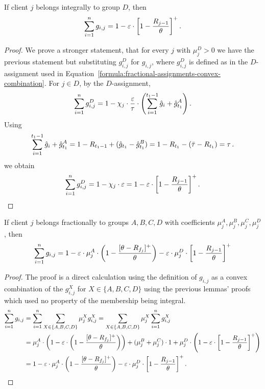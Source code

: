 \begin{lemma}\label{lem:gen-D}
    If client $j$ belongs integrally to group $D$, then
    \begin{equation*}
       \sum_{i=1}^n g_{i,j} = 1 - \varepsilon \cdot \left[1 - \frac{R_{j-1}}{\theta}\right]^+.
    \end{equation*}
\end{lemma}
\begin{proof}
    We prove a stronger statement, that for every $j$ with $\mu_j^D > 0$ we have the previous statement but substituting $g_{i,j}^D$ for $g_{i,j}$, where $g_{i,j}^D$ is defined as in the $D$-assignment used in Equation~\ref{formula:fractional-assignments-convex-combination}.
    For $j \in D$, by the $D$-assignment,
    \begin{equation*}
        \sum_{i=1}^n g_{i,j}^D = 1 - \chi_j \cdot \frac{\varepsilon}{\tau} \cdot \left(\sum_{i=1}^{t_1-1} \hat{g}_i + \hat{g}_{t_1}^A\right).
    \end{equation*}
    Using
    \begin{equation*}
        \sum_{i=1}^{t_1-1} \hat{g}_i + \hat{g}_{t_1}^A = 1 - R_{t_1 - 1} + (\hat{g}_{t_1} - \hat{g}_{t_1}^B) = 1 - R_{t_1} - (\bar\tau - R_{t_1}) = \tau\,.
    \end{equation*}
    we obtain
    \begin{equation*}
        \sum_{i=1}^n g_{i,j}^D = 1 - \chi_j \cdot \varepsilon
        = 1 - \varepsilon \cdot \left[1 - \frac{R_{j-1}}{\theta}\right]^+.
    \end{equation*}
\end{proof}

\begin{lemma}\label{lem:gen-fractional}
    If client $j$ belongs fractionally to groups $A,B,C,D$ with coefficients $\mu_j^A, \mu_j^B, \mu_j^C, \mu_j^D$, then
    \begin{equation*}
        \sum_{i=1}^n g_{i,j} = 1 - \varepsilon \cdot \mu_j^A \cdot \left(1 - \frac{[\theta - R_{f_j}]^+}{\theta}\right) - \varepsilon \cdot \mu_j^D \cdot \left[1 - \frac{R_{j-1}}{\theta}\right]^+
    \end{equation*}
\end{lemma}
\begin{proof}
    The proof is a direct calculation using the definition of $g_{i,j}$ as a convex combination of the $g_{i,j}^X$ for $X \in \{A,B,C,D\}$ using the previous lemmas' proofs which used no property of the membership being integral.
    \begin{align*}
        \sum_{i=1}^n g_{i,j}
        &= \sum_{i=1}^n \sum_{X\in\{A,B,C,D\}} \mu_j^X g_{i,j}^X
        = \sum_{X\in\{A,B,C,D\}} \mu_j^X \sum_{i=1}^n g_{i,j}^X \\
        &= \mu_j^A \cdot \left(1 - \varepsilon \cdot \left(1 - \frac{[\theta - R_{f_j}]^+}{\theta}\right)\right) + (\mu_j^B + \mu_j^C) \cdot 1 + \mu_j^D \cdot \left(1 - \varepsilon \cdot \left[1 - \frac{R_{j-1}}{\theta}\right]^+\right)\\
        &= 1 - \varepsilon \cdot \mu_j^A \cdot \left(1 - \frac{[\theta - R_{f_j}]^+}{\theta}\right) - \varepsilon \cdot \mu_j^D \cdot \left[1 - \frac{R_{j-1}}{\theta}\right]^+.
    \end{align*}
\end{proof}

